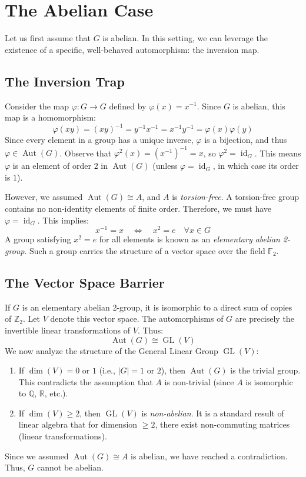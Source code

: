 \documentclass{book}
\newcommand{\F}{{\mathbb{F}}}
\newcommand{\Q}{{\mathbb{Q}}}
\newcommand{\R}{{\mathbb{R}}}
\newcommand{\Z}{{\mathbb{Z}}}
\newcommand{\id}{{\operatorname{id}}}
\newcommand{\GL}{{\operatorname{GL}}}
\newcommand{\Aut}{{\operatorname{Aut}}}
\let\temp\phi
\let\phi\varphi
\let\varphi\temp
\begin{document}
\section{The Abelian Case}

Let us first assume that $G$ is abelian. In this setting, we can leverage the existence of a specific, well-behaved automorphism: the inversion map.

\subsection{The Inversion Trap}

Consider the map $\phi: G \to G$ defined by $\phi(x) = x^{-1}$. Since $G$ is abelian, this map is a homomorphism:
\[
    \phi(xy) = (xy)^{-1} = y^{-1}x^{-1} = x^{-1}y^{-1} = \phi(x)\phi(y)
\]
Since every element in a group has a unique inverse, $\phi$ is a bijection, and thus $\phi \in \Aut(G)$.
Observe that $\phi^2(x) = (x^{-1})^{-1} = x$, so $\phi^2 = \id_G$. This means $\phi$ is an element of order
$2$ in $\Aut(G)$ (unless $\phi = \id_G$, in which case its order is $1$).

However, we assumed $\Aut(G) \cong A$, and $A$ is \emph{torsion-free}. A torsion-free group contains no
non-identity elements of finite order. Therefore, we must have $\phi = \id_G$. This implies:
\[
    x^{-1} = x \quad\iff\quad x^2 = e \quad \forall x \in G
\]
A group satisfying $x^2 = e$ for all elements is known as an \emph{elementary abelian 2-group}. Such a group
carries the structure of a vector space over the field $\F_2$.

\subsection{The Vector Space Barrier}

If $G$ is an elementary abelian 2-group, it is isomorphic to a direct sum of copies of $\Z_2$. Let $V$ denote this vector space. The automorphisms of $G$ are precisely the invertible linear transformations of $V$. Thus:
\[
    \Aut(G) \cong \GL(V)
\]
We now analyze the structure of the General Linear Group $\GL(V)$:
\begin{enumerate}
    \item If $\dim(V) = 0$ or $1$ (i.e., $|G| = 1$ or $2$), then $\Aut(G)$ is the trivial group. This contradicts the assumption that $A$ is non-trivial (since $A$ is isomorphic to $\Q$, $\R$, etc.).
    \item If $\dim(V) \ge 2$, then $\GL(V)$ is \emph{non-abelian}. It is a standard result of linear algebra that for dimension $\ge 2$, there exist non-commuting matrices (linear transformations).
\end{enumerate}
Since we assumed $\Aut(G) \cong A$ is abelian, we have reached a contradiction. Thus, $G$ cannot be abelian.
\end{document}
